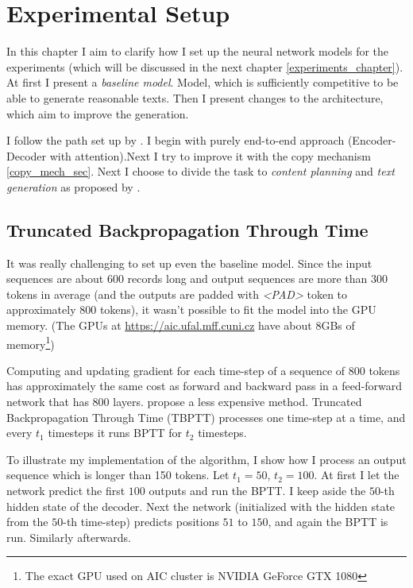 \chapter{Experimental Setup} \label{chapter:experimental_setup}
In this chapter I aim to clarify how I set up the neural network models for the experiments (which will be discussed in the next chapter \ref{experiments_chapter}). At first I present a \emph{baseline model}. Model, which is sufficiently competitive to be able to generate reasonable texts. Then I present changes to the architecture, which aim to improve the generation.

I follow the path set up by \citep{wiseman2017}. I begin with purely end-to-end approach (Encoder-Decoder with attention).Next I try to improve it with the copy mechanism \ref{copy_mech_sec}. Next I choose to divide the task to \emph{content planning} and \emph{text generation} as proposed by \citep{puduppully2019datatotext}.

\section{Truncated Backpropagation Through Time} \label{truncated_backprop_subsubsection}

It was really challenging to set up even the baseline model. Since the input sequences are about 600 records long and output sequences are more than 300 tokens in average (and the outputs are padded with \emph{\textless PAD\textgreater} token to approximately 800 tokens), it wasn't possible to fit the model into the GPU memory. (The GPUs at \url{https://aic.ufal.mff.cuni.cz} have about 8GBs of memory\footnote{The exact GPU used on AIC cluster is NVIDIA GeForce GTX 1080})

Computing and updating gradient for each time-step of a sequence of 800 tokens has approximately the same cost as forward and backward pass in a feed-forward network that has 800 layers. \citep{williamsTBPTT} propose a less expensive method. Truncated Backpropagation Through Time (TBPTT) processes one time-step at a time, and every $t_1$ timesteps it runs BPTT for $t_2$ timesteps.

To illustrate my implementation of the algorithm, I show how I process an output sequence which is longer than 150 tokens. Let $t_1 = 50$, $t_2 = 100$. At first I let the network predict the first $100$ outputs and run the BPTT. I keep aside the $50$-th hidden state of the decoder. Next the network (initialized with the hidden state from the $50$-th time-step) predicts positions $51$ to $150$, and again the BPTT is run. Similarly afterwards.

